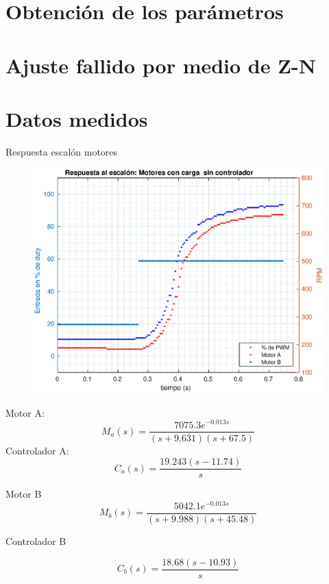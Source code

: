 \documentclass[10pt,conference,a4paper,onecolumn]{article}%
\begin{document}
\section{Obtención de los parámetros}

\section{Ajuste fallido por medio de Z-N}


\section{Datos medidos}
Respuesta escalón motores


\begin{figure}[h]
\centering
\includegraphics[width=15cm]{./imagenes/resp_escalon_motores_2}
\end{figure}
Motor A:
\begin{equation}
M_a(s)= \frac{7075.3 e^{-0.013s}}{(s+9.631)(s+67.5)}
\end{equation}
Controlador A:
\begin{equation}
C_a(s)= \frac{  19.243 (s-11.74)}{s}
\end{equation}


Motor B
\begin{equation}
M_b(s)= \frac{5042.1 e^{-0.013s}}{(s+9.988) (s+45.48)}
\end{equation}

Controlador B

\begin{equation}
C_b(s)= \frac{ 18.68 (s-10.93)}{s}
\end{equation}
\end{document}
